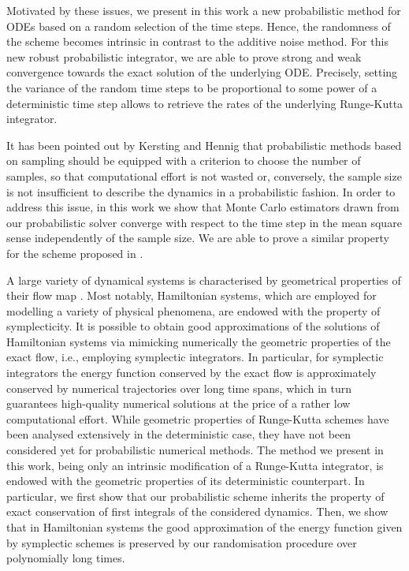 \documentclass[10pt]{article}
\begin{document}
Motivated by these issues, we present in this work a new probabilistic method for ODEs based on a random selection of the time steps. Hence, the randomness of the scheme becomes intrinsic in contrast to the additive noise method. For this new robust probabilistic integrator, we are able to prove strong and weak convergence towards the exact solution of the underlying ODE. Precisely, setting the variance of the random time steps to be proportional to some power of a deterministic time step allows to retrieve the rates of the underlying Runge-Kutta integrator.

It has been pointed out by Kersting and Hennig \cite{KeH16} that probabilistic methods based on sampling should be equipped with a criterion to choose the number of samples, so that computational effort is not wasted or, conversely, the sample size is not insufficient to describe the dynamics in a probabilistic fashion. In order to address this issue, in this work we show that Monte Carlo estimators drawn from our probabilistic solver converge with respect to the time step in the mean square sense independently of the sample size. We are able to prove a similar property for the scheme proposed in \cite{CGS16}.

A large variety of dynamical systems is characterised by geometrical properties of their flow map \cite{HLW06}. Most notably, Hamiltonian systems, which are employed for modelling a variety of physical phenomena, are endowed with the property of symplecticity. It is possible to obtain good approximations of the solutions of Hamiltonian systems via mimicking numerically the geometric properties of the exact flow, i.e., employing symplectic integrators. In particular, for symplectic integrators the energy function conserved by the exact flow is approximately conserved by numerical trajectories over long time spans, which in turn guarantees high-quality numerical solutions at the price of a rather low computational effort. While geometric properties of Runge-Kutta schemes have been analysed extensively in the deterministic case, they have not been considered yet for probabilistic numerical methods. The method we present in this work, being only an intrinsic modification of a Runge-Kutta integrator, is endowed with the geometric properties of its deterministic counterpart. In particular, we first show that our probabilistic scheme inherits the property of exact conservation of first integrals of the considered dynamics. Then, we show that in Hamiltonian systems the good approximation of the energy function given by symplectic schemes is preserved by our randomisation procedure over polynomially long times.
\end{document}
